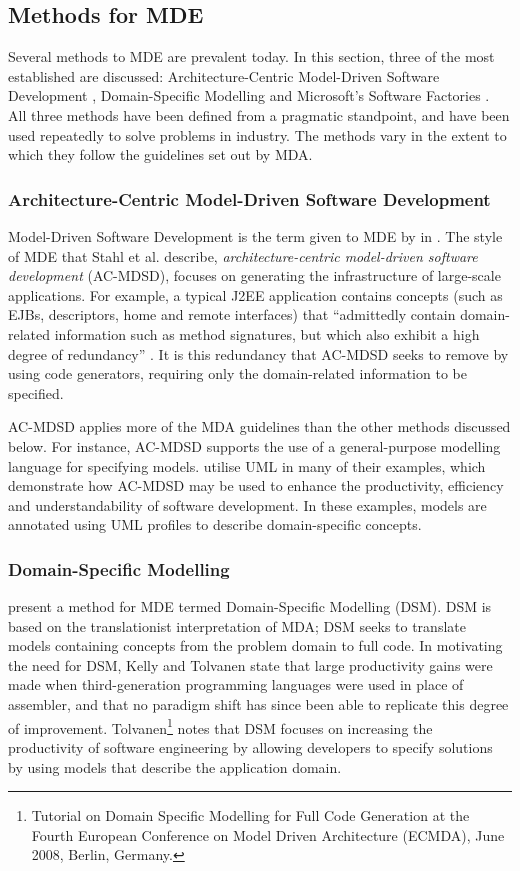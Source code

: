 \subsection{Methods for MDE}
Several methods to MDE are prevalent today. In this section, three of the most established are discussed: Architecture-Centric Model-Driven Software Development \cite{stahl06mdsd}, Domain-Specific Modelling \cite{kelly08dsm} and Microsoft's Software Factories \cite{greenfield04software}. All three methods have been defined from a pragmatic standpoint, and have been used repeatedly to solve problems in industry. The methods vary in the extent to which they follow the guidelines set out by MDA.

\subsubsection{Architecture-Centric Model-Driven Software Development}
Model-Driven Software Development is the term given to MDE by in \cite{stahl06mdsd}. The style of MDE that Stahl et al. describe, \textit{architecture-centric model-driven software development} (AC-MDSD), focuses on generating the infrastructure of large-scale applications. For example, a typical J2EE application contains concepts (such as EJBs, descriptors, home and remote interfaces) that ``admittedly contain domain-related information such as method signatures, but which also exhibit a high degree of redundancy'' \cite{stahl06mdsd}. It is this redundancy that AC-MDSD seeks to remove by using code generators, requiring only the domain-related information to be specified.

AC-MDSD applies more of the MDA guidelines than the other methods discussed below. For instance, AC-MDSD supports the use of a general-purpose modelling language for specifying models. \cite{stahl06mdsd} utilise UML in many of their examples, which demonstrate how AC-MDSD may be used to enhance the productivity, efficiency and understandability of software development. In these examples, models are annotated using UML profiles to describe domain-specific concepts.


\subsubsection{Domain-Specific Modelling}
\cite{kelly08dsm} present a method for MDE termed Domain-Specific Modelling (DSM). DSM is based on the translationist interpretation of MDA; DSM seeks to translate models containing concepts from the problem domain to full code. In motivating the need for DSM, Kelly and Tolvanen state that large productivity gains were made when third-generation programming languages were used in place of assembler, and that no paradigm shift has since been able to replicate this degree of improvement. Tolvanen\footnote{Tutorial on Domain Specific Modelling for Full Code Generation at the Fourth European Conference on Model Driven Architecture (ECMDA), June 2008, Berlin, Germany.} notes that DSM focuses on increasing the productivity of software engineering by allowing developers to specify solutions by using models that describe the application domain.

